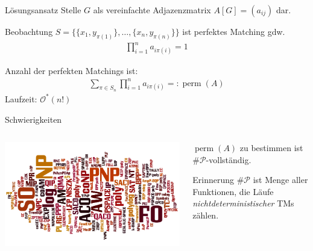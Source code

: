 \documentclass[table,german,10pt]{beamer}
\DeclareMathOperator{\perm}{perm}
\begin{document}
\begin{frame}{Lösungsansatz}
  Stelle $G$ als vereinfachte Adjazenzmatrix $A[G]=(a_{ij})$ dar.
  \pause
  \begin{block}{Beobachtung}
    $S=\{\{x_{1},y_{\pi(1)}\},\ldots,\{x_{n},y_{\pi(n)}\}\}$ ist
    perfektes Matching gdw.
    \begin{align*}
      \prod_{i=1}^{n}a_{i\pi(i)}=1
    \end{align*}
  \end{block}
  \pause
  \begin{theorem}
    Anzahl der perfekten Matchings ist:
    \begin{align*}
      \sum_{\pi\in S_{n}}\prod_{i=1}^{n}a_{i\pi(i)} =: \perm(A)
    \end{align*}
    Laufzeit: $\mathcal{O}^{*}(n!)$
  \end{theorem}
\end{frame}
\begin{frame}{Schwierigkeiten}
  \begin{columns}
    \begin{column}{5cm}
      \includegraphics[scale=0.25,angle=-90]{zoo}
    \end{column}
    \begin{column}{7cm}
      \begin{theorem}[Valiant 1979]
        $\perm(A)$ zu bestimmen ist $\#\mathcal{P}$-vollständig.
      \end{theorem}
      \pause
      \begin{block}{Erinnerung}
        $\#\mathcal{P}$ ist Menge aller Funktionen, die Läufe
        \emph{nichtdeterministischer} TMs zählen.
      \end{block}
    \end{column}
  \end{columns}
\end{frame}
\end{document}
